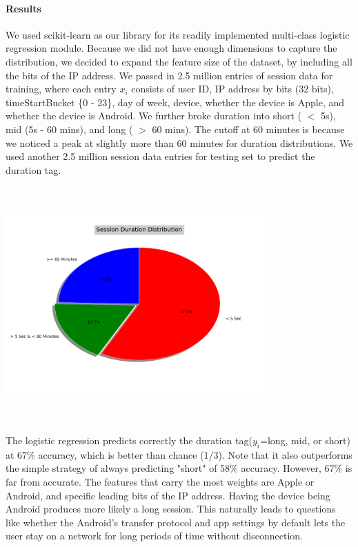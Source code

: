 \documentclass[]{article}
\newenvironment{Figure}
  {\par\medskip\noindent\minipage{\linewidth}}
  {\endminipage\par\medskip}
\begin{document}
\paragraph{Results}

We used scikit-learn\cite{scikitlearn} as our library for its readily implemented multi-class logistic regression module. Because we did not have enough dimensions to capture the distribution, we decided to expand the feature size of the dataset, by including all the bits of the IP address. We passed in 2.5 million entries of session data for training, where each entry $x_i$ consists of user ID, IP address by bits (32 bits), timeStartBucket \{0 - 23\}, day of week, device, whether the device is Apple, and whether the device is Android. We further broke duration into short ( $<$ 5s), mid (5s - 60 mins), and long ( $>$ 60 mins). The cutoff at 60 minutes is because we noticed a peak at slightly more than 60 minutes for duration distributions. We used another 2.5 million session data entries for testing set to predict the duration tag.

\begin{Figure}
 \centering
 \includegraphics[height = 9cm, width =10cm]{durationDistPie.png}
\end{Figure}

The logistic regression predicts correctly the duration tag($y_i$=long, mid, or short) at $67\%$ accuracy, which is better than chance (1/3). Note that it also outperforms the simple strategy of always predicting "short" of 58\% accuracy. However, 67\% is far from accurate. The features that carry the most weights are Apple or Android, and specific leading bits of the IP address. Having the device being Android produces more likely a long session. This naturally leads to questions like whether the Android's transfer protocol and app settings by default lets the user stay on a network for long periods of time without disconnection.
\end{document}
